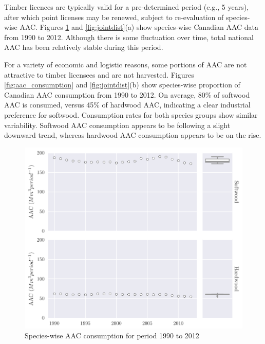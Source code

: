 Timber licences are typically valid for a pre-determined period (e.g., 5 years), after which point licenses may be renewed, subject to re-evaluation of species-wise AAC. Figures \ref{fig:aac} and \ref{fig:jointdist}(a) show species-wise Canadian AAC data from 1990 to 2012. Although there is some fluctuation over time, total national AAC has been relatively stable during this period.

For a variety of economic and logistic reasons, some portions of AAC are not attractive to timber licensees and are not harvested. Figures \ref{fig:aac_consumption} and \ref{fig:jointdist}(b) show species-wise proportion of Canadian AAC consumption from 1990 to 2012. On average, 80\% of softwood AAC is consumed, versus 45\% of hardwood AAC, indicating a clear industrial preference for softwood. Consumption rates for both species groups show similar variability. Softwood AAC consumption appears to be following a slight downward trend, whereas hardwood AAC consumption appears to be on the rise. 

\begin{figure}[h]
  \centering
  \includegraphics[width=\textwidth]{images/aac}
  \caption{Species-wise AAC consumption for period 1990 to 2012}
  \label{fig:aac}
\end{figure}

